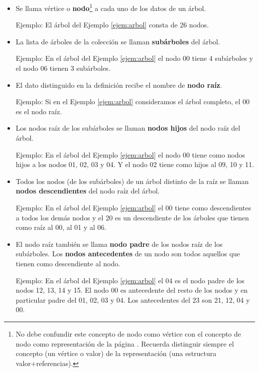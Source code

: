 \begin{itemize}
\item 
Se llama {vértice} o \textbf{nodo}\footnote{No debe confundir este concepto de nodo como vértice con el concepto de nodo como representación de la página \pageref{def:coneptoNodo}. Recuerda distinguir siempre el concepto (un vértice o valor) de la representación (una estructura valor+referencias).} a cada uno de los datos de un árbol.

Ejemplo: El árbol del Ejemplo \ref{ejem:arbol} consta de 26 nodos.

\item 
La lista de árboles de la colección se llaman \textbf{subárboles} del árbol.

Ejemplo: En el árbol del Ejemplo \ref{ejem:arbol} el nodo 00 tiene 4 subárboles y el nodo 06 tienen 3 subárboles.

\item 
El dato distinguido en la definición recibe el nombre de \textbf{nodo raíz}.

Ejemplo: Si en el Ejemplo \ref{ejem:arbol} consideramos el árbol completo, el  00 es el nodo raíz.


\item 
Los nodos raíz de los subárboles se llaman \textbf{nodos hijos} del nodo raíz del árbol.

Ejemplo: En el árbol del Ejemplo \ref{ejem:arbol} el nodo 00 tiene como nodos hijos a los nodos 01, 02, 03 y 04. Y el nodo 02 tiene como hijos al 09, 10 y 11.


\item 
Todos los nodos (de los subárboles) de un árbol distinto de la raíz se llaman \textbf{nodos descendientes} del nodo raíz del árbol.

Ejemplo: En el árbol del Ejemplo \ref{ejem:arbol} el 00 tiene como descendientes a todos los demás nodos y el 20 es un descendiente de los árboles que tienen como raíz al 00, al 01 y al 06. 


\item 
El nodo raíz también se llama \textbf{nodo padre} de los nodos raíz de los subárboles.
Los \textbf{nodos antecedentes} de un nodo son todos aquellos que tienen como descendiente al nodo.

Ejemplo: En el árbol del Ejemplo \ref{ejem:arbol} el 04 es el nodo padre de los nodos 12, 13, 14  y 15. El nodo 00 es antecedente del resto de los nodos y en particular padre del 01, 02, 03 y 04. Los antecedentes del 23 son 21, 12, 04 y 00.


\end{itemize}
